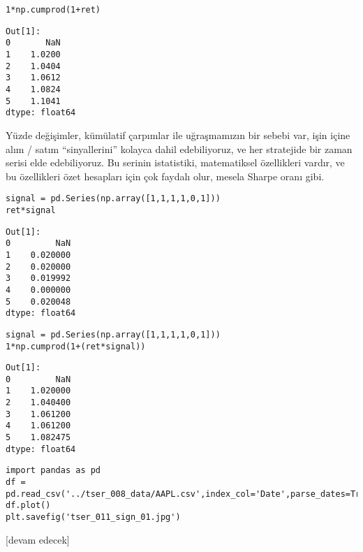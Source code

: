 \documentclass[12pt,fleqn]{article}\usepackage{../../common}
\begin{document}
\begin{verbatim}
1*np.cumprod(1+ret)
\end{verbatim}

\begin{verbatim}
Out[1]: 
0       NaN
1    1.0200
2    1.0404
3    1.0612
4    1.0824
5    1.1041
dtype: float64
\end{verbatim}

Yüzde değişimler, kümülatif çarpımlar ile uğraşmamızın bir sebebi var, işin
içine alım / satım ``sinyallerini'' kolayca dahil edebiliyoruz, ve her
stratejide bir zaman serisi elde edebiliyoruz. Bu serinin istatistiki,
matematiksel özellikleri vardır, ve bu özellikleri özet hesapları için çok
faydalı olur, mesela Sharpe oranı gibi.

\begin{verbatim}
signal = pd.Series(np.array([1,1,1,1,0,1]))
ret*signal
\end{verbatim}

\begin{verbatim}
Out[1]: 
0         NaN
1    0.020000
2    0.020000
3    0.019992
4    0.000000
5    0.020048
dtype: float64
\end{verbatim}

\begin{verbatim}
signal = pd.Series(np.array([1,1,1,1,0,1]))
1*np.cumprod(1+(ret*signal))
\end{verbatim}

\begin{verbatim}
Out[1]: 
0         NaN
1    1.020000
2    1.040400
3    1.061200
4    1.061200
5    1.082475
dtype: float64
\end{verbatim}

















\begin{verbatim}
import pandas as pd
df = pd.read_csv('../tser_008_data/AAPL.csv',index_col='Date',parse_dates=True)
df.plot()
plt.savefig('tser_011_sign_01.jpg')
\end{verbatim}




[devam edecek]
  
\end{document}
